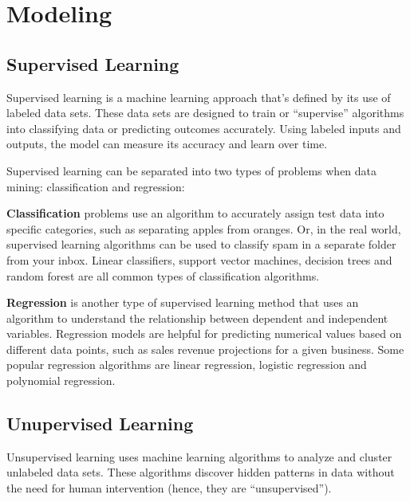 	\chapter{Modeling}
	\section{Supervised Learning}
Supervised learning is a machine learning approach that's defined by its use of labeled data sets. These data sets are designed to train or ``supervise'' algorithms into classifying data or predicting outcomes accurately. Using labeled inputs and outputs, the model can measure its accuracy and learn over time.

Supervised learning can be separated into two types of problems when data mining: classification and regression:
	\begin{bulletedlist}
		\item \textbf{Classification} problems use an algorithm to accurately assign test data into specific categories, such as separating apples from oranges. Or, in the real world, supervised learning algorithms can be used to classify spam in a separate folder from your inbox. Linear classifiers, support vector machines, decision trees and random forest are all common types of classification algorithms.
		\item \textbf{Regression} is another type of supervised learning method that uses an algorithm to understand the relationship between dependent and independent variables. Regression models are helpful for predicting numerical values based on different data points, such as sales revenue projections for a given business. Some popular regression algorithms are linear regression, logistic regression and polynomial regression.
	\end{bulletedlist}

	\section{Unupervised Learning}
Unsupervised learning uses machine learning algorithms to analyze and cluster unlabeled data sets. These algorithms discover hidden patterns in data without the need for human intervention (hence, they are ``unsupervised'').

